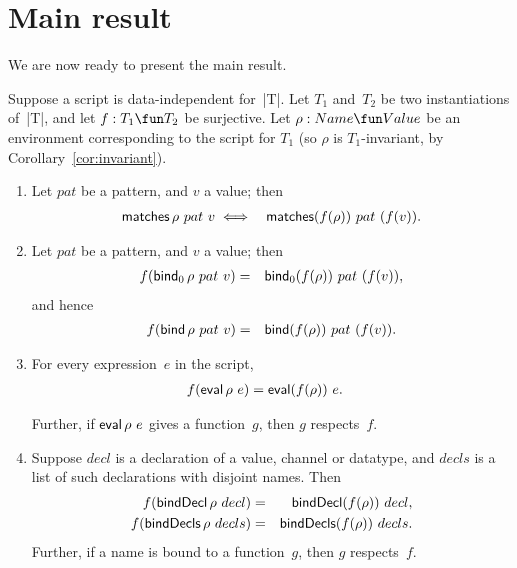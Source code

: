 \section{Main result}
\label{sec:main-result}

We are now ready to present the main result.
%
\begin{prop}
\label{prop:expressions}
Suppose a script is data-independent for~|T|.  Let $T_1$ and~$T_2$ be two
instantiations of~|T|, and let $f : T_1 \fun T_2$ be surjective.  Let $\rho:
Name \fun Value$ be an environment corresponding to the script for $T_1$ (so
$\rho$ is $T_1$-invariant, by Corollary~\ref{cor:invariant}).  
%
\begin{enumerate}
\item\label{item:matches} Let $pat$ be a pattern, and $v$ a value; then
\begin{eqnarray*}
  \mathop{\sf matches} \rho~ pat~v & \iff & \mathop{\sf matches} (f(\rho)) ~ pat~(f(v)).
\end{eqnarray*}

\item\label{item:bind}
Let $pat$ be a pattern, and $v$ a value; then
\begin{eqnarray*}
f  (\mathop{\sf bind}\nolimits_0 \rho~pat~v) &  = & \mathop{\sf bind}\nolimits_0 (f(\rho))~pat~(f(v)),
\end{eqnarray*}
and hence
\begin{eqnarray*}
f  (\mathop{\sf bind}\nolimits \rho~pat~v) & = & \mathop{\sf bind}\nolimits (f(\rho))~pat~(f(v)).
\end{eqnarray*}


\item\label{item:eval} For every expression~$e$ in the script,
\begin{eqnarray*}
f(\mathop{\sf eval} \rho ~ e) & = \mathop{\sf eval} (f(\rho)) ~e .
\end{eqnarray*}

Further, if $\mathop{\sf eval} \rho ~ e$ gives a function~$g$, then $g$ respects~$f$. 


\item\label{item:bindDecls} Suppose $decl$ is a declaration of a value,
  channel or datatype, and $decls$ is a list of such declarations with
  disjoint names.  Then
  \begin{eqnarray*}
  f (\mathop{\sf bindDecl} \rho~decl) & = & \mathop{\sf bindDecl} (f(\rho))~decl, \\
  f (\mathop{\sf bindDecls} \rho~decls) & = & \mathop{\sf bindDecls} (f(\rho))~decls.
  \end{eqnarray*}
%
Further, if a name is bound to a function~$g$, then $g$ respects~$f$. 


\end{enumerate}
\end{prop}
